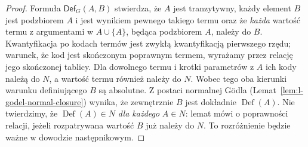 \begin{proof}
Formuła $\mathsf{Def}_G(A,B)$ stwierdza, że $A$ jest
tranzytywny, każdy element $B$ jest podzbiorem $A$
i jest wynikiem pewnego takiego termu oraz że
\emph{każda} wartość termu z argumentami w
$A\cup\{A\}$, będąca podzbiorem $A$, należy do $B$.
Kwantyfikacja po kodach termów jest zwykłą
kwantyfikacją pierwszego rzędu; warunek, że kod jest
skończonym poprawnym termem, wyrażamy przez relację
jego skończonej tablicy. Dla dowolnego termu i
krotki parametrów z $A$ ich kody należą do $N$,
a wartość termu również należy do $N$. Wobec tego
oba kierunki warunku definiującego $B$ są absolutne.
Z postaci normalnej Gödla
(Lemat~\ref{lem:l-godel-normal-closure}) wynika, że
zewnętrznie $B$ jest dokładnie $\operatorname{Def}(A)$.
Nie twierdzimy, że $\operatorname{Def}(A)\in N$
\emph{dla każdego} $A\in N$: lemat mówi o poprawności
relacji, jeżeli rozpatrywana wartość $B$ już należy
do $N$. To rozróżnienie będzie ważne w dowodzie
następnikowym.
\end{proof}

